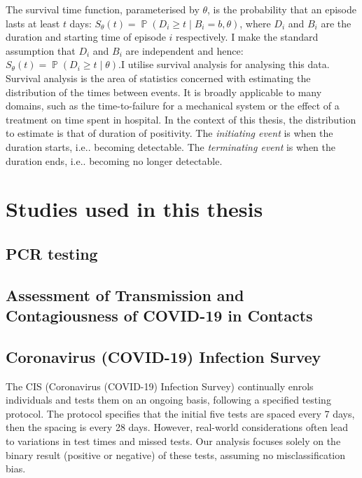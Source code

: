 \documentclass{cam-thesis}
\makeatletter
\DeclareRobustCommand\onedot{\futurelet\@let@token\@onedot}
\def\@onedot{\ifx\@let@token.\else.\null\fi\xspace}
\def\ie{i.e\onedot} \def\Ie{\emph{I.e}\onedot}
\DeclareMathOperator{\prob}{\mathbb{P}}
\makeatother
\begin{document}
The survival time function, parameterised by $\theta$, is the probability that an episode lasts at least $t$ days: $S_\theta(t) = \prob(D_i \geq t \mid B_i = b, \theta)$, where $D_i$ and $B_i$ are the duration and starting time of episode $i$ respectively.
I make the standard assumption that $D_i$ and $B_i$ are independent and hence: $S_\theta(t) = \prob(D_i \geq t \mid \theta)$.I utilise survival analysis for analysing this data.
Survival analysis is the area of statistics concerned with estimating the distribution of the times between events.
It is broadly applicable to many domains, such as the time-to-failure for a mechanical system or the effect of a treatment on time spent in hospital.
In the context of this thesis, the distribution to estimate is that of duration of positivity.
The \emph{initiating event} is when the duration starts, \ie becoming detectable.
The \emph{terminating event} is when the duration ends, \ie becoming no longer detectable.

\chapter{Studies used in this thesis} \label{intro:sec:studies}

\section{PCR testing} \label{intro:sec:PCR}

\section{Assessment of Transmission and Contagiousness of COVID-19 in Contacts}

\section{Coronavirus (COVID-19) Infection Survey} \label{intro:sec:cis}

The CIS (Coronavirus (COVID-19) Infection Survey) continually enrols individuals and tests them on an ongoing basis, following a
specified testing protocol. The protocol specifies that the initial five
tests are spaced every 7 days, then the spacing is every 28 days.
However, real-world considerations often lead to variations in test
times and missed tests. Our analysis focuses solely on the binary result
(positive or negative) of these tests, assuming no misclassification
bias.
\end{document}
